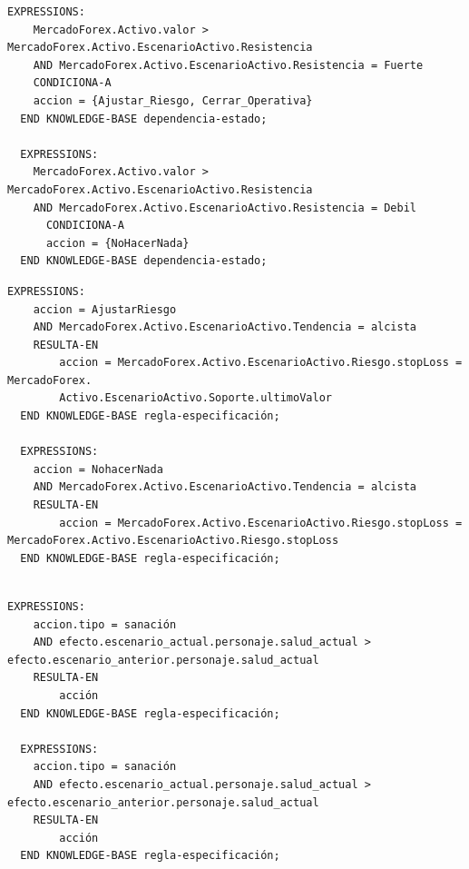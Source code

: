 \begin{lstlisting}[style=Python-color, caption={dependencia-estado}]
  EXPRESSIONS:
    MercadoForex.Activo.valor > MercadoForex.Activo.EscenarioActivo.Resistencia
    AND MercadoForex.Activo.EscenarioActivo.Resistencia = Fuerte
    CONDICIONA-A
    accion = {Ajustar_Riesgo, Cerrar_Operativa}
  END KNOWLEDGE-BASE dependencia-estado;

  EXPRESSIONS:
    MercadoForex.Activo.valor > MercadoForex.Activo.EscenarioActivo.Resistencia
    AND MercadoForex.Activo.EscenarioActivo.Resistencia = Debil
      CONDICIONA-A
      accion = {NoHacerNada}
  END KNOWLEDGE-BASE dependencia-estado;
\end{lstlisting}

\begin{lstlisting}[style=Python-color, caption={regla-especificación}]
  EXPRESSIONS:
    accion = AjustarRiesgo
    AND MercadoForex.Activo.EscenarioActivo.Tendencia = alcista
    RESULTA-EN
        accion = MercadoForex.Activo.EscenarioActivo.Riesgo.stopLoss = MercadoForex.
        Activo.EscenarioActivo.Soporte.ultimoValor     
  END KNOWLEDGE-BASE regla-especificación;
  
  EXPRESSIONS:
    accion = NohacerNada
    AND MercadoForex.Activo.EscenarioActivo.Tendencia = alcista
    RESULTA-EN
        accion = MercadoForex.Activo.EscenarioActivo.Riesgo.stopLoss = MercadoForex.Activo.EscenarioActivo.Riesgo.stopLoss       
  END KNOWLEDGE-BASE regla-especificación;
  

\end{lstlisting}

\begin{lstlisting}[style=Python-color, caption={regla-verificación}]
  EXPRESSIONS:
    accion.tipo = sanación
    AND efecto.escenario_actual.personaje.salud_actual > efecto.escenario_anterior.personaje.salud_actual
    RESULTA-EN
        acción
  END KNOWLEDGE-BASE regla-especificación;

  EXPRESSIONS:
    accion.tipo = sanación
    AND efecto.escenario_actual.personaje.salud_actual > efecto.escenario_anterior.personaje.salud_actual
    RESULTA-EN
        acción
  END KNOWLEDGE-BASE regla-especificación;


\end{lstlisting}




